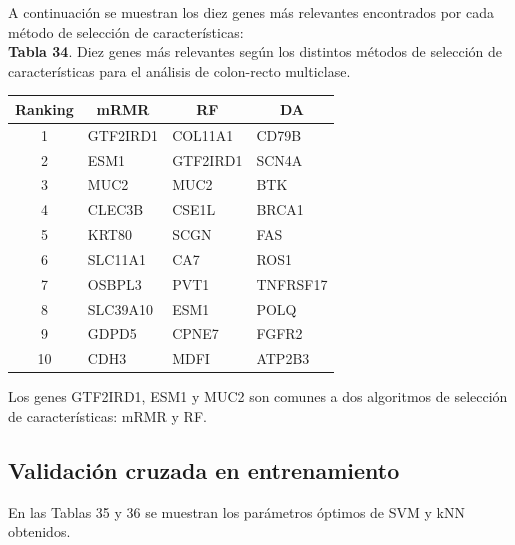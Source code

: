 \newpage
A continuación se muestran los diez genes más relevantes encontrados por cada método de selección de características:\\

\textbf{Tabla 34}. Diez genes más relevantes según los distintos métodos de selección de características para el análisis de colon-recto multiclase.

\begin{table}[H]
	\centering
	\begin{tabular}{clll}
		\hline
		Ranking & \multicolumn{1}{c}{mRMR} & \multicolumn{1}{c}{RF} & \multicolumn{1}{c}{DA} \\ \hline
		1       & GTF2IRD1                 & COL11A1                & CD79B                  \\
		2       & ESM1                     & GTF2IRD1               & SCN4A                  \\
		3       & MUC2                     & MUC2                   & BTK                    \\
		4       & CLEC3B                   & CSE1L                  & BRCA1                  \\
		5       & KRT80                    & SCGN                   & FAS                    \\
		6       & SLC11A1                  & CA7                    & ROS1                   \\
		7       & OSBPL3                   & PVT1                   & TNFRSF17               \\
		8       & SLC39A10                 & ESM1                   & POLQ                   \\
		9       & GDPD5                    & CPNE7                  & FGFR2                  \\
		10      & CDH3                     & MDFI                   & ATP2B3                 \\ \hline
	\end{tabular}
\end{table}

Los genes GTF2IRD1, ESM1 y MUC2 son comunes a dos algoritmos de selección de características: mRMR y RF.

\subsection{Validación cruzada en entrenamiento}

En las Tablas 35 y 36 se muestran los parámetros óptimos de SVM y kNN obtenidos.\\

